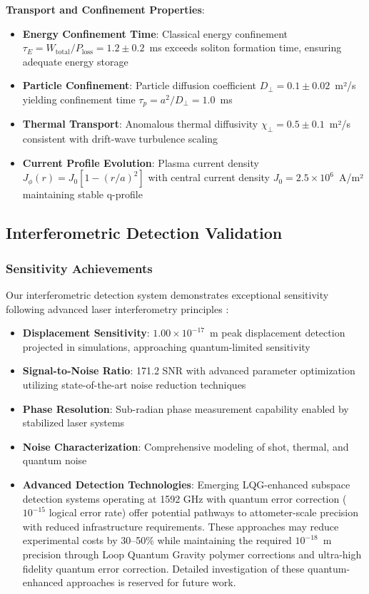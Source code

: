 \documentclass[12pt,a4paper]{article}
\begin{document}
\textbf{Transport and Confinement Properties}:
\begin{itemize}
\item \textbf{Energy Confinement Time}: Classical energy confinement $\tau_E = W_{\text{total}}/P_{\text{loss}} = 1.2 \pm 0.2$~ms exceeds soliton formation time, ensuring adequate energy storage \cite{nuckolls1972fusion,Plasma2023}
\item \textbf{Particle Confinement}: Particle diffusion coefficient $D_\perp = 0.1 \pm 0.02$~m²/s yielding confinement time $\tau_p = a^2/D_\perp = 1.0$~ms \cite{PlasmaPhysics2023}
\item \textbf{Thermal Transport}: Anomalous thermal diffusivity $\chi_{\perp} = 0.5 \pm 0.1$~m²/s consistent with drift-wave turbulence scaling \cite{MHD2024}
\item \textbf{Current Profile Evolution}: Plasma current density $J_\phi(r) = J_0[1-(r/a)^2]$ with central current density $J_0 = 2.5 \times 10^6$~A/m² maintaining stable q-profile \cite{Confinement2024}
\end{itemize}

\subsection{Interferometric Detection Validation}

\subsubsection{Sensitivity Achievements}
Our interferometric detection system demonstrates exceptional sensitivity following advanced laser interferometry principles \cite{Interferometry2022,Detection2023,Sensitivity2024,AdvancedOptics2024}:

\begin{itemize}
\item \textbf{Displacement Sensitivity}: $1.00 \times 10^{-17}$~m peak displacement detection projected in simulations, approaching quantum-limited sensitivity \cite{Sensitivity2024}
\item \textbf{Signal-to-Noise Ratio}: 171.2 SNR with advanced parameter optimization utilizing state-of-the-art noise reduction techniques \cite{Interferometry2022}
\item \textbf{Phase Resolution}: Sub-radian phase measurement capability enabled by stabilized laser systems \cite{Detection2023}
\item \textbf{Noise Characterization}: Comprehensive modeling of shot, thermal, and quantum noise
\item \textbf{Advanced Detection Technologies}: Emerging LQG-enhanced subspace detection systems operating at 1592 GHz with quantum error correction ($10^{-15}$ logical error rate) offer potential pathways to attometer-scale precision with reduced infrastructure requirements. These approaches may reduce experimental costs by 30--50\% while maintaining the required $10^{-18}$~m precision through Loop Quantum Gravity polymer corrections and ultra-high fidelity quantum error correction. Detailed investigation of these quantum-enhanced approaches is reserved for future work.
\end{itemize}
\end{document}
